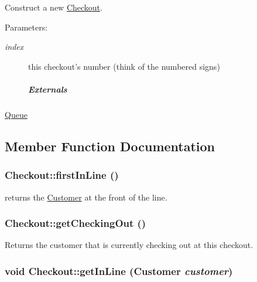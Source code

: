 Construct a new \hyperlink{class_checkout}{Checkout}. 

\begin{Desc}
\item[Parameters:]
\begin{description}
\item[{\em index}]this checkout's number (think of the numbered signs) \subparagraph*{Externals}\end{description}
\end{Desc}
\hyperlink{class_queue}{Queue} 

\subsection{Member Function Documentation}
\hypertarget{class_checkout_a54ef065c4835713f1352c7ae2441b26}{
\subsubsection[{firstInLine}]{ Checkout::firstInLine ()}}
\label{class_checkout_a54ef065c4835713f1352c7ae2441b26}


returns the \hyperlink{class_customer}{Customer} at the front of the line. 

\hypertarget{class_checkout_34ad05140dec86ca8726f703075a2f20}{
\subsubsection[{getCheckingOut}]{ Checkout::getCheckingOut ()}}
\label{class_checkout_34ad05140dec86ca8726f703075a2f20}


Returns the customer that is currently checking out at this checkout. 

\hypertarget{class_checkout_2e38f69374aaa88101b7acb54c326823}{
\subsubsection[{getInLine}]{\setlength{\rightskip}{0pt plus 5cm}void Checkout::getInLine ({\bf Customer} {\em customer})}}
\label{class_checkout_2e38f69374aaa88101b7acb54c326823}


